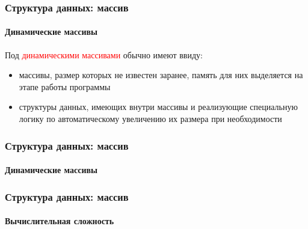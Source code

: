 \documentclass[aspectratio=169]{beamer}
\begin{document}
\begin{frame}
\frametitle{Структура данных: массив}
\framesubtitle{Динамические массивы}
\justifying
\small
Под \textcolor{red}{динамическими массивами} обычно имеют ввиду:

\begin{itemize}
\item{массивы, размер которых не известен заранее, память для них выделяется на этапе работы программы}

\item{структуры данных, имеющих внутри массивы и реализующие специальную логику по автоматическому увеличению их размера при необходимости}
\end{itemize}

\begin{figure}
    \captionsetup[subfigure]{labelformat=empty}
    \centering
\end{figure}
\end{frame}

\begin{frame}
\frametitle{Структура данных: массив}
\framesubtitle{Динамические массивы}
\justifying
\small

\begin{figure}
    \captionsetup[subfigure]{labelformat=empty}
    \centering
\end{figure}
\end{frame}

\begin{frame}
\frametitle{Структура данных: массив}
\framesubtitle{Вычислительная сложность}
\justifying
\small

\begin{figure}
    \captionsetup[subfigure]{labelformat=empty}
    \centering
\end{figure}
\end{frame}
\end{document}
